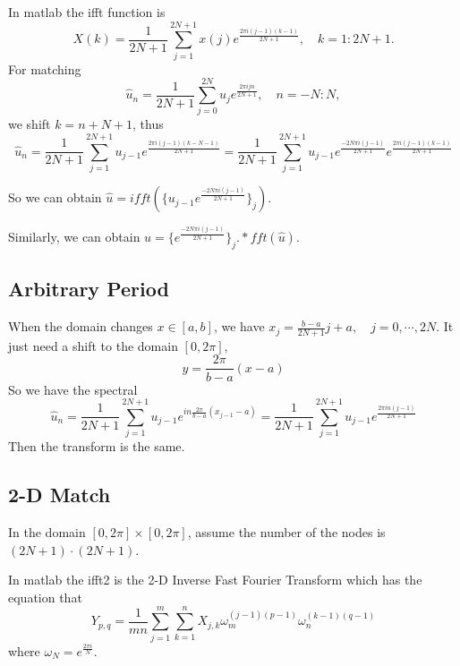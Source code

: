 \documentclass[a4paper]{article}
\begin{document}
In matlab the ifft function is
\begin{equation}
    X(k)=\frac{1}{2N+1}\sum_{j=1}^{2N+1}x(j)e^{\frac{2\pi i(j-1)(k-1)}{2N+1}},\quad k = 1:2N+1.
\end{equation}
For matching
\begin{equation}
    \hat{u}_n=\frac{1}{2N+1}\sum_{j=0}^{2N}u_je^{\frac{2\pi ijn}{2N+1}},\quad n = -N:N,
\end{equation}
we shift $k=n+N+1$, thus 
\begin{equation}
    \hat{u}_n=\frac{1}{2N+1}\sum_{j=1}^{2N+1}u_{j-1}e^{\frac{2\pi i(j-1)(k-N-1)}{2N+1}}
    =\frac{1}{2N+1}\sum_{j=1}^{2N+1}u_{j-1}e^{\frac{-2N\pi i(j-1)}{2N+1}}e^{\frac{2\pi i(j-1)(k-1)}{2N+1}}
\end{equation}

So we can obtain $\hat{u}=ifft(\{u_{j-1}e^{\frac{-2N\pi i(j-1)}{2N+1}}\}_j)$.

Similarly, we can obtain $u=\{e^{\frac{-2N\pi i(j-1)}{2N+1}}\}_j.*fft(\hat{u})$.

\subsection{Arbitrary Period}
When the domain changes $x\in [a,b]$, we have $x_j=\frac{b-a}{2N+1}j+a,\quad j=0,\cdots,2N$. It just need a shift to the domain $[0,2\pi]$,
\begin{equation}
    y=\frac{2\pi}{b-a}(x-a)
\end{equation}
So we have the spectral 
\begin{equation}
    \hat{u}_n=\frac{1}{2N+1}\sum_{j=1}^{2N+1}u_{j-1}e^{in\frac{2\pi}{b-a}(x_{j-1}-a)}=\frac{1}{2N+1}\sum_{j=1}^{2N+1}u_{j-1}e^{\frac{2\pi in(j-1)}{2N+1}}
\end{equation}
Then the transform is the same.

\subsection{2-D Match}
In the domain $[0,2\pi]\times[0,2\pi]$, assume the number of the nodes is $(2N+1)\cdot(2N+1)$.

In matlab the ifft2 is the 2-D Inverse Fast Fourier Transform which has the equation that
\begin{equation}
    Y_{p,q}=\frac{1}{mn}\sum_{j=1}^{m}\sum_{k=1}^{n}X_{j,k}\omega_m^{(j-1)(p-1)}\omega_n^{(k-1)(q-1)}
\end{equation}
where $\omega_N=e^{\frac{2\pi i}{N}}$.
\end{document}
